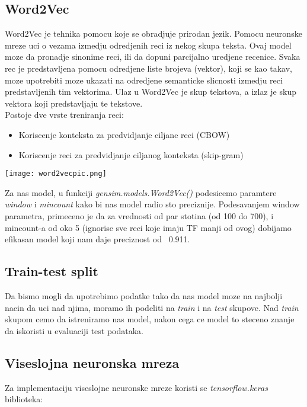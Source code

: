\documentclass{article}
\begin{document}
\subsection{Word2Vec}
Word2Vec je tehnika pomocu koje se obradjuje prirodan jezik. Pomocu neuronske mreze uci o vezama izmedju odredjenih reci iz nekog skupa teksta. Ovaj model moze da pronadje sinonime reci, ili da dopuni parcijalno uredjene recenice. Svaka rec je predstavljena pomocu odredjene liste brojeva (vektor), koji se kao takav, moze upotrebiti moze ukazati na odredjene semanticke slicnosti izmedju reci predstavljenih tim vektorima. Ulaz u Word2Vec je skup tekstova, a izlaz je skup vektora koji predstavljaju te tekstove.\\
Postoje dve vrste treniranja reci: 
\begin{itemize}
    \item Koriscenje konteksta za predvidjanje ciljane reci (CBOW)
    \item Koriscenje reci za predvidjanje ciljanog konteksta (skip-gram)
\end{itemize}
\texttt{[image: word2vecpic.png]}

Za nas model, u funkciji \textit{gensim.models.Word2Vec() } podesicemo paramtere \textit{window} i \textit{min\textunderscore count} kako bi nas model radio sto preciznije. Podesavanjem window parametra, primeceno je da za vrednosti od par stotina (od 100 do 700), i min\textunderscore count-a od oko 5 (ignorise sve reci koje imaju TF manji od ovog) dobijamo efikasan model koji nam daje preciznost od ~0.911.


\subsection{Train-test split}
Da bismo mogli da upotrebimo podatke tako da nas model moze na najbolji nacin da uci nad njima, moramo ih podeliti na \textit{train} i na \textit{test} skupove. Nad \textit{train} skupom cemo da istreniramo nas model, nakon cega ce model to steceno znanje da iskoristi u evaluaciji test podataka.\\


\subsection{Viseslojna neuronska mreza}
Za implementaciju viseslojne neuronske mreze koristi se \textit{tensorflow.keras} biblioteka: \\
\end{document}

